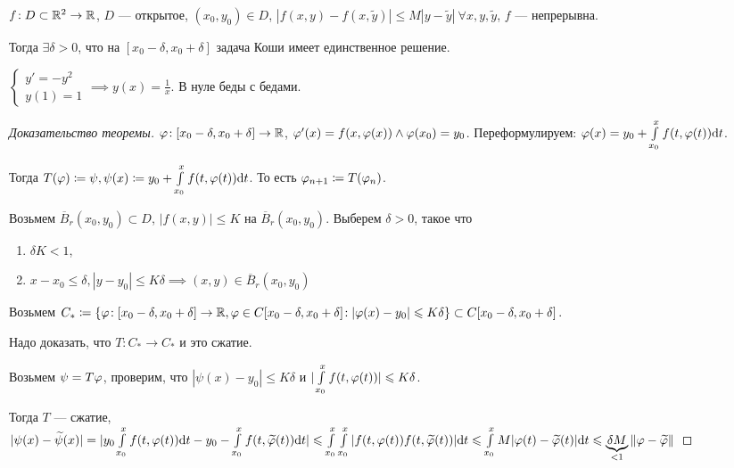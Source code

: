 \begin{theorem}[Пикара]
    $f\!: D \subset \mathbb{R}^2 \to \mathbb{R}$,  $D$ --- открытое,  $(x_0, y_0) \in D$, $|f(x, y) - f(x, \widetilde{y})| \le M |y-\widetilde{y}|\ \forall x, y, \widetilde{y}$, $f$ --- непрерывна.

    Тогда  $\exists \delta > 0$, что на  $[x_0 - \delta, x_0 + \delta]$ задача Коши имеет единственное решение.
\end{theorem}
\begin{remark}
    $\begin{cases} y' = -y^2\\y(1) = 1 \end{cases} \implies y(x) = \frac{1}{x}$. В нуле беды с бедами.
\end{remark}
\begin{proof}[Доказательство теоремы]
    $\varphi\!: [x_0-\delta, x_0 + \delta] \to \mathbb{R}$,  $\varphi'(x) = f(x, \varphi(x)) \land \varphi(x_0) = y_0$. Переформулируем: $\varphi(x) = y_0 + \int\limits_{x_0}^x f(t, \varphi(t)) \mathrm{d}t$.

    Тогда $T(\varphi) \coloneqq \psi, \psi(x) \coloneqq y_0 + \int\limits_{x_0}^x f(t, \varphi(t)) \mathrm{d}t$. То есть $\varphi_{n+1} \coloneqq T(\varphi_n)$.

    Возьмем  $\overline{B}_r(x_0, y_0) \subset D$,  $|f(x, y)| \le K$ на $\overline{B}_r(x_0, y_0)$. Выберем $\delta > 0$, такое что 
    \begin{enumerate}
        \item $\delta K < 1$,
        \item  $x - x_0 \le \delta, |y-y_0| \le K\delta \implies (x, y) \in \overline{B}_r(x_0, y_0)$
    \end{enumerate}
    Возьмем $C_* \coloneqq \{ \varphi\!: [x_0 -\delta, x_0 + \delta] \to \mathbb{R}, \varphi \in C[x_0 - \delta, x_0 + \delta]\!: |\varphi(x) - y_0| \leqslant K\delta\} \subset C[x_0-\delta, x_0 + \delta]$.

    Надо доказать, что $T\!: C_* \to C_*$ и это сжатие.

    Возьмем $\psi = T\varphi$, проверим, что $|\psi(x) - y_0| \le K\delta$ и $|\int\limits_{x_0}^x f(t, \varphi(t))| \leqslant K\delta$.

    Тогда $T$ --- сжатие,  $|\psi(x) - \widetilde{\psi}(x)| = |y_0 \int\limits_{x_0}^x f(t, \varphi(t))\mathrm{d}t - y_0 -\int\limits_{x_0}^x f(t, \widetilde{\varphi}(t)) \mathrm{d}t| \leqslant \int\limits_{x_0}^x \int\limits_{x_0}^x |f(t, \varphi(t)) f(t, \widetilde{\varphi}(t))| \mathrm{d}t \leqslant \int\limits_{x_0}^x M|\varphi(t) - \widetilde{\varphi}(t)|\mathrm{d}t \leqslant \underbrace{\delta M}_{< 1} \|\varphi - \widetilde{\varphi}\|$
\end{proof}
